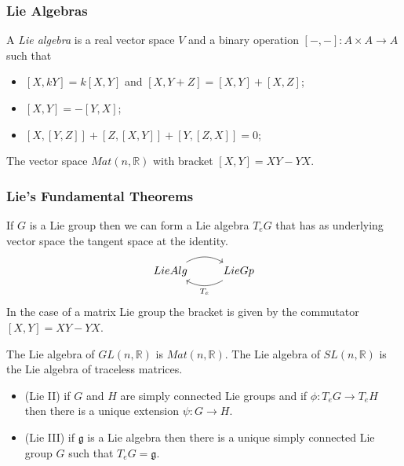 \documentclass[]{beamer}
\begin{document}
\begin{frame}[fragile]\frametitle{Lie Algebras}
    \begin{definition}
        A \emph{Lie algebra} is a real vector space $V$ and a binary operation $[-,-]:A\times A \rightarrow A$ such that
        \begin{itemize}
            \item $[X,kY]=k[X,Y]$ and $[X,Y+Z]=[X,Y]+[X,Z]$;
            \item $[X,Y]=-[Y,X]$;
            \item $[X,[Y,Z]]+[Z,[X,Y]]+[Y,[Z,X]]=0$;
        \end{itemize}
    \end{definition}
    \begin{example}
        The vector space $Mat(n,\mathbb{R})$ with bracket $[X,Y]=XY-YX$.
    \end{example}
\end{frame}

\begin{frame}[fragile]\frametitle{Lie's Fundamental Theorems}
If $G$ is a Lie group then we can form a Lie algebra $T_e G$ that has as underlying vector space the tangent space at the identity.
\begin{equation*}
    \begin{tikzcd}
        LieAlg \rar[bend left] & LieGp \lar[bend left]{T_e}
    \end{tikzcd}
\end{equation*}
In the case of a matrix Lie group the bracket is given by the commutator $[X,Y]=XY-YX$.
\begin{example}
    The Lie algebra of $GL(n,\mathbb{R})$ is $Mat(n,\mathbb{R})$.
    The Lie algebra of $SL(n,\mathbb{R})$ is the Lie algebra of traceless matrices.
\end{example}
\begin{theorem}
    \begin{itemize}
        \item (Lie II) if $G$ and $H$ are simply connected Lie groups and if $\phi:T_e G \rightarrow T_e H$ then there is a unique extension $\psi:G\rightarrow H$.
        \item (Lie III) if $\mathfrak{g}$ is a Lie algebra then there is a unique simply connected Lie group $G$ such that $T_e G = \mathfrak{g}$.
    \end{itemize}
\end{theorem}

\end{frame}
\end{document}
